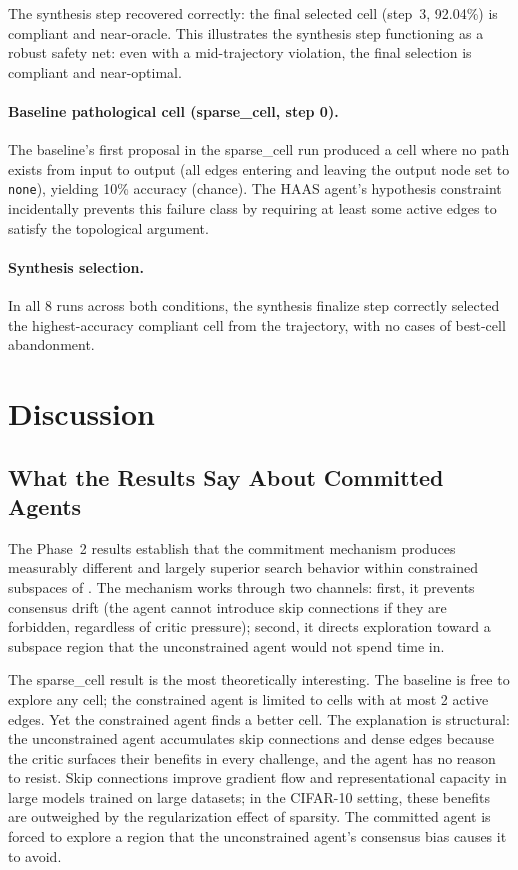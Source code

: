 The synthesis step recovered correctly: the final selected cell (step~3,
92.04\%) is compliant and near-oracle. This illustrates the synthesis step
functioning as a robust safety net: even with a mid-trajectory violation,
the final selection is compliant and near-optimal.

\paragraph{Baseline pathological cell (sparse\_cell, step 0).}
The baseline's first proposal in the sparse\_cell run produced a cell where
no path exists from input to output (all edges entering and leaving the output
node set to \texttt{none}), yielding 10\% accuracy (chance). The HAAS agent's
hypothesis constraint incidentally prevents this failure class by requiring
at least some active edges to satisfy the topological argument.

\paragraph{Synthesis selection.}
In all 8 runs across both conditions, the synthesis finalize step correctly
selected the highest-accuracy compliant cell from the trajectory, with no
cases of best-cell abandonment.

\section{Discussion}
\label{sec:discussion}

\subsection{What the Results Say About Committed Agents}

The Phase~2 results establish that the \haas{} commitment mechanism produces
measurably different and largely superior search behavior within constrained
subspaces of \nasbench{}. The mechanism works through two channels: first,
it prevents consensus drift (the agent cannot introduce skip connections if
they are forbidden, regardless of critic pressure); second, it directs
exploration toward a subspace region that the unconstrained agent would
not spend time in.

The sparse\_cell result is the most theoretically interesting. The baseline
is free to explore any cell; the constrained agent is limited to cells with
at most 2 active edges. Yet the constrained agent finds a better cell. The
explanation is structural: the unconstrained agent accumulates skip connections
and dense edges because the critic surfaces their benefits in every challenge,
and the agent has no reason to resist. Skip connections improve gradient flow
and representational capacity in large models trained on large datasets; in the
\nasbench{} CIFAR-10 setting, these benefits are outweighed by the regularization
effect of sparsity. The committed agent is forced to explore a region that the
unconstrained agent's consensus bias causes it to avoid.

